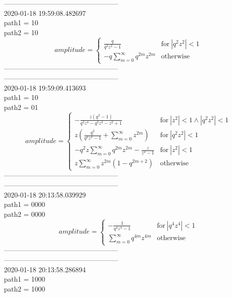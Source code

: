 --------------------------------------------------\\
2020-01-18 19:59:08.482697\\
path1 = 10\\
path2 = 10\\
$$amplitude = \begin{cases} \frac{q}{q^{2} z^{2} - 1} & \text{for}\: \left|{q^{2} z^{2}}\right| < 1 \\- q \sum_{m=0}^{\infty} q^{2 m} z^{2 m} & \text{otherwise} \end{cases}$$
--------------------------------------------------\\
--------------------------------------------------\\
2020-01-18 19:59:09.413693\\
path1 = 10\\
path2 = 01\\
$$amplitude = \begin{cases} - \frac{z \left(q^{2} - 1\right)}{q^{2} z^{4} - q^{2} z^{2} - z^{2} + 1} & \text{for}\: \left|{z^{2}}\right| < 1 \wedge \left|{q^{2} z^{2}}\right| < 1 \\z \left(\frac{q^{2}}{q^{2} z^{2} - 1} + \sum_{m=0}^{\infty} z^{2 m}\right) & \text{for}\: \left|{q^{2} z^{2}}\right| < 1 \\- q^{2} z \sum_{m=0}^{\infty} q^{2 m} z^{2 m} - \frac{z}{z^{2} - 1} & \text{for}\: \left|{z^{2}}\right| < 1 \\z \sum_{m=0}^{\infty} z^{2 m} \left(1 - q^{2 m + 2}\right) & \text{otherwise} \end{cases}$$
--------------------------------------------------\\
--------------------------------------------------\\
2020-01-18 20:13:58.039929\\
path1 = 0000\\
path2 = 0000\\
$$amplitude = \begin{cases} - \frac{1}{q^{4} z^{4} - 1} & \text{for}\: \left|{q^{4} z^{4}}\right| < 1 \\\sum_{m=0}^{\infty} q^{4 m} z^{4 m} & \text{otherwise} \end{cases}$$
--------------------------------------------------\\
--------------------------------------------------\\
2020-01-18 20:13:58.286894\\
path1 = 1000\\
path2 = 1000\\
